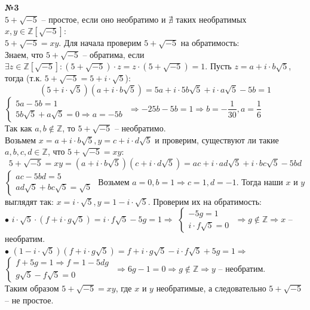 \documentclass[a4paper, 12pt]{article}
\newcommand{\Z}{\mathbb{Z}}
\begin{document}
	\textbf{№3} \\
	
	$5+\sqrt{-5}$ -- простое, если оно необратимо и $\nexists$ таких необратимых $x,y \in \Z[\sqrt{-5}]$:\\ $5+\sqrt{-5} = xy$. Для начала проверим $5+\sqrt{-5}$ на обратимость: \\
	Знаем, что $5+\sqrt{-5}$ -- обратима, если $\exists z\in \Z[\sqrt{-5}]: (5+\sqrt{-5})\cdot z = z\cdot (5+\sqrt{-5}) = 1$. Пусть $z = a + i\cdot b\sqrt{5}$, тогда (т.к. $5+\sqrt{-5} = 5+i\cdot\sqrt{5}$):
	$$(5+i\cdot\sqrt{5})(a + i\cdot b\sqrt{5}) = 5a + i\cdot5b\sqrt{5} +i\cdot a\sqrt{5}-5b = 1$$
	$\begin{cases}
		5a-5b = 1 \\
		5b\sqrt{5}+a\sqrt{5} = 0 \Rightarrow a = -5b
	\end{cases}$
	 $\Rightarrow -25b-5b = 1 \Rightarrow b = -\dfrac{1}{30}, a = \dfrac{1}{6}$ \\
	 Так как $a, b \notin \Z$, то $5+\sqrt{-5}$ -- необратимо. \\
	 
	 Возьмем $x = a + i\cdot b\sqrt{5}, y = c + i\cdot d\sqrt{5}$ и проверим, существуют ли такие $a, b, c, d \in\Z$, что $5+\sqrt{-5} = xy$:
	 $$5+\sqrt{-5} = xy = (a + i\cdot b\sqrt{5})(c + i\cdot d\sqrt{5}) = ac + i\cdot ad\sqrt{5} + i\cdot bc\sqrt{5} - 5bd$$
	 $\begin{cases}
	 ac - 5bd = 5 \\
	 ad\sqrt{5} + bc\sqrt{5} = \sqrt{5}
	 \end{cases}$ 
	 Возьмем $a = 0, b = 1 \Rightarrow c = 1, d = -1$. Тогда наши $x$ и $y$ выглядят так: $x = i\cdot \sqrt{5}, y = 1 - i\cdot\sqrt{5}$. Проверим их на обратимость: \\
	 $\bullet$ $i\cdot \sqrt{5}\cdot(f + i\cdot g\sqrt{5}) = i\cdot f\sqrt{5} - 5g = 1 \Rightarrow$
	 $\begin{cases}
	 	-5g = 1 \\
	 	i\cdot f\sqrt{5} = 0
	 \end{cases}$
	 $\Rightarrow g \notin\Z\Rightarrow x$ -- необратим. \\
	 $\bullet$ $(1 - i\cdot\sqrt{5})(f + i\cdot g\sqrt{5}) = f + i\cdot g\sqrt{5} - i\cdot f\sqrt{5} + 5g = 1 \Rightarrow$
	 $\begin{cases}
	 f + 5g = 1 \Rightarrow f = 1 - 5dg \\
	 g\sqrt{5} - f\sqrt{5} = 0
	 \end{cases}$
	 $\Rightarrow 6g - 1 = 0 \Rightarrow g \notin\Z\Rightarrow y$ -- необратим. \\
	 Таким образом $5+\sqrt{-5} = xy$, где $x$ и $y$ необратимые, а следовательно $5+\sqrt{-5}$ -- не простое. \\
	 
\end{document}
